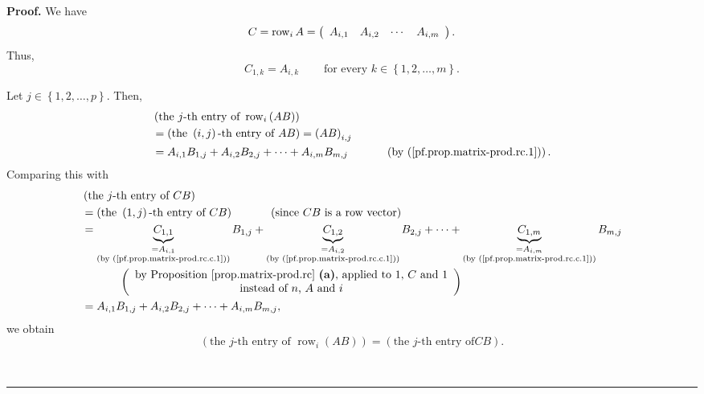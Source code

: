 \documentclass[numbers=enddot,12pt,final,onecolumn,notitlepage]{scrartcl}%
\theoremstyle{definition}
\newenvironment{proof}[1][Proof]{\noindent\textbf{#1.} }{\ \rule{0.5em}{0.5em}}
\begin{document}
\begin{proof}
We have%
\[
C=\operatorname*{row}\nolimits_{i}A=\left(
\begin{array}
[c]{cccc}%
A_{i,1} & A_{i,2} & \cdots & A_{i,m}%
\end{array}
\right)  .
\]
Thus,%
\begin{equation}
C_{1,k}=A_{i,k}\ \ \ \ \ \ \ \ \ \ \text{for every }k\in\left\{
1,2,\ldots,m\right\}  . \label{pf.prop.matrix-prod.rc.c.1}%
\end{equation}


Let $j\in\left\{  1,2,\ldots,p\right\}  $. Then,%
\begin{align*}
&  \left(  \text{the }j\text{-th entry of }\operatorname*{row}\nolimits_{i}%
\left(  AB\right)  \right) \\
&  =\left(  \text{the }\left(  i,j\right)  \text{-th entry of }AB\right)
=\left(  AB\right)  _{i,j}\\
&  =A_{i,1}B_{1,j}+A_{i,2}B_{2,j}+\cdots+A_{i,m}B_{m,j}%
\ \ \ \ \ \ \ \ \ \ \left(  \text{by (\ref{pf.prop.matrix-prod.rc.1})}\right)
.
\end{align*}
Comparing this with%
\begin{align*}
&  \left(  \text{the }j\text{-th entry of }CB\right) \\
&  =\left(  \text{the }\left(  1,j\right)  \text{-th entry of }CB\right)
\ \ \ \ \ \ \ \ \ \ \left(  \text{since }CB\text{ is a row vector}\right) \\
&  =\underbrace{C_{1,1}}_{\substack{=A_{i,1}\\\text{(by
(\ref{pf.prop.matrix-prod.rc.c.1}))}}}B_{1,j}+\underbrace{C_{1,2}%
}_{\substack{=A_{i,2}\\\text{(by (\ref{pf.prop.matrix-prod.rc.c.1}))}}%
}B_{2,j}+\cdots+\underbrace{C_{1,m}}_{\substack{=A_{i,m}\\\text{(by
(\ref{pf.prop.matrix-prod.rc.c.1}))}}}B_{m,j}\\
&  \ \ \ \ \ \ \ \ \ \ \left(
\begin{array}
[c]{c}%
\text{by Proposition \ref{prop.matrix-prod.rc} \textbf{(a)}, applied to
}1\text{, }C\text{ and }1\\
\text{instead of }n\text{, }A\text{ and }i
\end{array}
\right) \\
&  =A_{i,1}B_{1,j}+A_{i,2}B_{2,j}+\cdots+A_{i,m}B_{m,j},
\end{align*}
we obtain%
\begin{equation}
\left(  \text{the }j\text{-th entry of }\operatorname*{row}\nolimits_{i}%
\left(  AB\right)  \right)  =\left(  \text{the }j\text{-th entry of
}CB\right)  . \label{pf.prop.matrix-prod.rc.c.5}%
\end{equation}



\end{proof}
\end{document}
